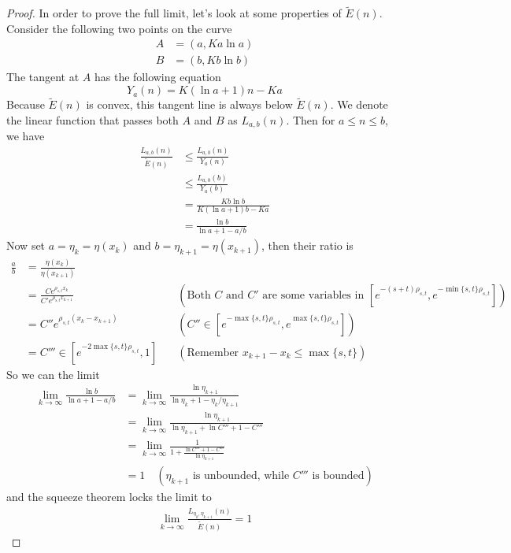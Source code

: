 \documentclass[]{article}
\begin{document}
\begin{proof}
	In order to prove the full limit, let's look at some properties of $\tilde{E}(n)$. Consider the following two points on the curve
	\begin{align*}
	A &= (a, K a\ln a)\\
	B &= (b, K b\ln b)
	\end{align*}
	The tangent at $A$ has the following equation
	\[
	Y_a(n) = K(\ln a + 1)n - Ka
	\]
	Because $\tilde{E}(n)$ is convex, this tangent line is always below $\tilde{E}(n)$. We denote the linear function that passes both $A$ and $B$ as $L_{a,b}(n)$. Then for $a\le n\le b$, we have
	\begin{align*}
	\frac{L_{a,b}(n)}{\tilde{E}(n)} &\le \frac{L_{a,b}(n)}{Y_a(n)} \\
	&\le \frac{L_{a,b}(b)}{Y_a(b)} \\
	&= \frac{Kb \ln b}{K(\ln a + 1)b - Ka}\\
	&= \frac{\ln b}{\ln a + 1 - a/b}
	\end{align*}
	Now set $a = \eta_{k} = \eta(x_k)$ and $b = \eta_{k+1} = \eta(x_{k+1})$, then their ratio is
	\begin{align*}
	\frac{a}{b} &= \frac{\eta(x_k)}{\eta(x_{k+1})}\\
		&= \frac{C e^{\rho_{s,t} x_k}}{C' e^{\rho_{s,t} x_{k+1}} } \quad &(\text{Both $C$ and $C'$ are some variables in $[e^{-(s+t)\rho_{s,t}},e^{-\min\{s,t\}\rho_{s,t}}]$})\\
		&= C'' e^{\rho_{s,t}(x_k-x_{k+1})} \quad &(C'' \in [e^{-\max\{s,t\}\rho_{s,t}}, e^{\max\{s,t\}\rho_{s,t}}]) \\
		& = C'''\in [e^{-2\max\{s,t\}\rho_{s,t}}, 1] \quad & (\text{Remember $x_{k+1} - x_{k} \le \max\{s,t\}$})
	\end{align*}
	So we can the limit
	\begin{align*}
	\lim_{k\to\infty} \frac{\ln b}{\ln a + 1 - a/b} &= \lim_{k\to\infty} \frac{\ln \eta_{k+1}}{\ln \eta_{k} + 1 - \eta_{k}/\eta_{k+1}}\\
	&= \lim_{k\to\infty} \frac{\ln \eta_{k+1}}{\ln \eta_{k+1} + \ln C''' + 1 - C'''} \\
	&= \lim_{k\to\infty} \frac{1}{1 + \frac{\ln C''' + 1 - C'''}{\ln \eta_{k+1}}} \\
	&= 1 \quad (\text{$\eta_{k+1}$ is unbounded, while $C'''$ is bounded})
	\end{align*}
	and the squeeze theorem locks the limit to
	\begin{align*}
	\lim_{k\to\infty}\frac{L_{\eta_{k},\eta_{k+1}}(n)}{\tilde{E}(n)} = 1
	\end{align*}

\end{proof}
\end{document}
